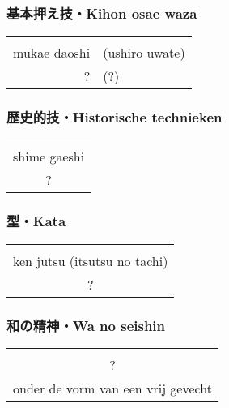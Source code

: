 \subsubsection{基本押え技・Kihon osae waza}
\begin{table}[H]
\begin{center}
\begin{tabular}{rl}
    \ruby{}{}\ruby{}{} & \\
    mukae daoshi & (ushiro uwate)\\
    ? & (?)
\end{tabular}
\end{center}
\label{kyuu_1_kihon_osae_waza}
\end{table}

\subsubsection{歴史的技・Historische technieken}
\begin{table}[H]
\begin{center}
\begin{tabular}{c}
    \ruby{}{}\ruby{}{}\\
    shime gaeshi\\
    ?
\end{tabular}
\end{center}
\label{kyuu_1_historic}
\end{table}

\subsubsection{型・Kata}
\begin{table}[H]
\begin{center}
\begin{tabular}{c}
    \ruby{}{}\ruby{}{}\\
    ken jutsu (itsutsu no tachi)\\
    ?
\end{tabular}
\end{center}
\label{kyuu_1_kata}
\end{table}

\subsubsection{和の精神・Wa no seishin}
\begin{table}[H]
\begin{center}
\begin{tabular}{c}
    \ruby{}{}\ruby{}{}\\
    ?\\
    onder de vorm van een vrij gevecht
\end{tabular}
\end{center}
\label{kyuu_1_wa_no_seishin}
\end{table}

